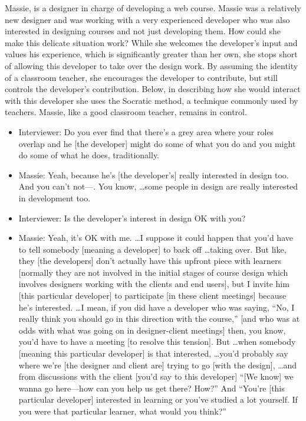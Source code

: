 \documentclass{chi2009}
\begin{document}
Massie, is a designer in charge of developing a web course.  Massie was a relatively new designer and was working with a very experienced developer who was also interested in designing courses and not just developing them.  How could she make this delicate situation work?  While she welcomes the developer’s input and values his experience, which is significantly greater than her own, she  stops short of allowing this developer to take over the design work. By assuming the identity of a classroom teacher, she encourages the developer to contribute, but still controls the developer's contribution. Below, in describing how she would interact with this developer she uses the Socratic method, a technique commonly used by teachers. Massie, like a good classroom teacher, remains in control. 
\begin{itemize}
\item [] Interviewer: Do you ever find that there's a grey area where your roles overlap and he [the developer] might do some of what you do and you might do some of what he does, traditionally.
\item [] Massie: Yeah, because he's [the developer's] really interested in design too. And you can't not—. You know, \ldots some people in design are really interested in development too.
\item [] Interviewer: Is the developer's interest in design OK with you?
\item [] Massie: Yeah, it's OK with me. \ldots I suppose it could happen that you'd have to tell somebody [meaning a developer] to back off \ldots taking over. But like, they [the developers] don't actually have this upfront piece with learners [normally they are not involved in the initial stages of course design which involves designers working with the clients and end users], but I invite him [this particular developer] to participate [in these client meetings] because he's interested. \ldots I mean, if you did have a developer who was saying, “No, I really think you should go in this direction with the course,” [and who was at odds with what was going on in designer-client meetings] then, you know, you'd have to have a meeting [to resolve this tension]. But \ldots when somebody [meaning this particular developer] is that interested, \ldots you'd probably say where we're [the designer and client are] trying to go [with the design], \ldots and from discussions with the client [you'd say to this developer] “[We know] we wanna go here---how can you help us get there? How?” And “You're [this particular developer] interested in learning or you've studied a lot yourself. If you were that particular learner, what would you think?” 
\end{itemize}
\end{document}
